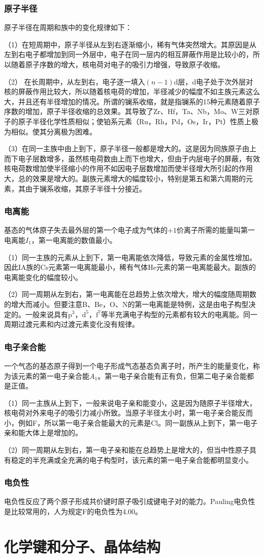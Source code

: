 \documentclass[
  10pt,
  twoside,
  openany,
  b5paper, %
  colorscheme = basic, %
]{qyxf-book}
\begin{document}
\subsection{原子半径}
原子半径在周期和族中的变化规律如下：

（1）在短周期中，原子半径从左到右逐渐缩小，稀有气体突然增大。其原因是从左到右电子都增加到同一外层中，电子在同一层内的相互屏蔽作用是比较小的，所以随着原子序数的增大，核电荷对电子的吸引力增强，导致原子收缩。

（2） 在长周期中，从左到右，电子逐一填入$(n-1)$d层，d电子处于次外层对核的屏蔽作用比较大，所以随着核电荷的增加，半径减少的幅度不如主族元素这么大，并且还有半径增加的情况。所谓的镧系收缩，就是指镧系的15种元素随着原子序数的增加，原子半径收缩的总效果。其导致了Zr、Hf，Ta、Nb，Mo、W三对原子的原子半径化学性质相似；使铂系元素（Ru，Rh，Pd，Os，Ir，Pt）性质上极为相似。使其分离极为困难。
	
（3）在同一主族中由上到下，原子半径一般都是增大的。这是因为同族原子由上而下电子层数增多，虽然核电荷数由上而下也增大，但由于内层电子的屏蔽，有效核电荷数增加使半径缩小的作用不如因电子层数增加而使半径增大所引起的作用大，总的效果是增大的。副族元素增大的幅度较小，特别是第五和第六周期的元素，其由于镧系收缩，其原子半径十分接近。

\subsection{电离能}

基态的气体原子失去最外层的第一个电子成为气体的$+1$价离子所需的能量叫第一电离能$I_1$，第一电离能的数值最小。

（1）同一主族的元素从上到下，第一电离能依次降低，导致元素的金属性增加。因此IA族的Cs元素第一电离能最小，稀有气体He元素的第一电离能最大。副族的电离能变化的幅度较小。

（2）同一周期从左到右，第一电离能在总趋势上依次增大，增大的幅度随周期数的增大而减小。但要注意B、Be，O、N的第一电离能是特例，这是由电子构型决定的。一般来说具有$\mathrm{p^3}$，$\mathrm{d^5}$，$\mathrm{f^7}$等半充满电子构型的元素都有较大的电离能。同一周期过渡元素和内过渡元素变化没有规律。

\subsection{电子亲合能}
一个气态的基态原子得到一个电子形成气态基态负离子时，所产生的能量变化，称为该元素的第一电子亲合能$A_1$。第一电子亲合能有正有负，但第二电子亲合能都是正值。

（1）同一主族从上到下，一般来说电子亲和能变小，这是因为随原子半径增大，核电荷对外来电子的吸引力减小所致。当原子半径太小时，第一电子亲合能反而小，例如F，所以第一电子亲合能最大的元素是Cl。同一副族从上到下，第一电子亲和能大体上是增加的。

（2）同一周期从左到右，第一电子亲和能在总趋势上是增大的，但当中性原子具有稳定的半充满或全充满的电子构型时，该元素的第一电子亲合能都明显变小。

\subsection{电负性}

电负性反应了两个原子形成共价键时原子吸引成键电子对的能力。Pauling电负性是比较常用的，人为规定F的电负性为4.00。
\chapter{化学键和分子、晶体结构}
\end{document}
